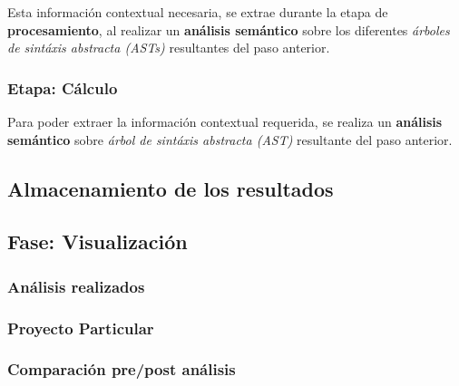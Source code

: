 Esta información contextual necesaria, se extrae durante la etapa de \textbf{procesamiento},
al realizar un \textbf{análisis semántico} sobre los diferentes \textit{árboles de sintáxis abstracta (ASTs)} 
resultantes del paso anterior.

\subsubsection{Etapa: Cálculo}


Para poder extraer la información contextual requerida, se realiza un \textbf{análisis semántico} sobre \textit{árbol de sintáxis abstracta (AST)} resultante del paso anterior.

\subsection{Almacenamiento de los resultados}


\subsection{Fase: Visualización}

\subsubsection{Análisis realizados}
\subsubsection{Proyecto Particular}
\subsubsection{Comparación pre/post análisis}
